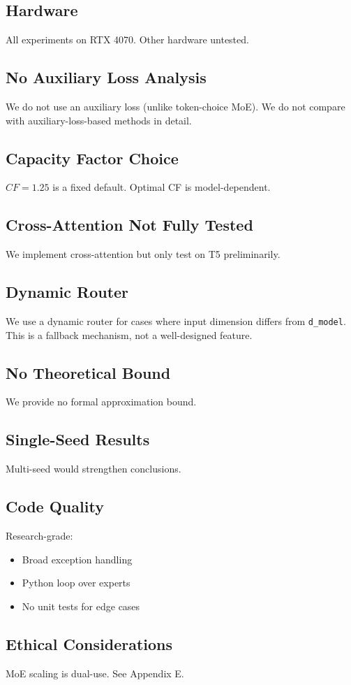 \subsection{Hardware}

All experiments on RTX 4070. Other hardware untested.

\subsection{No Auxiliary Loss Analysis}

We do not use an auxiliary loss (unlike token-choice MoE). We do not 
compare with auxiliary-loss-based methods in detail.

\subsection{Capacity Factor Choice}

$CF = 1.25$ is a fixed default. Optimal CF is 
model-dependent.

\subsection{Cross-Attention Not Fully Tested}

We implement cross-attention but only test on T5 preliminarily.

\subsection{Dynamic Router}

We use a dynamic router for cases where input dimension differs from 
\texttt{d\_model}. This is a fallback mechanism, not a well-designed feature.

\subsection{No Theoretical Bound}

We provide no formal approximation bound.

\subsection{Single-Seed Results}

Multi-seed would strengthen conclusions.

\subsection{Code Quality}

Research-grade:
\begin{itemize}
\item Broad exception handling
\item Python loop over experts
\item No unit tests for edge cases

\end{itemize}
\subsection{Ethical Considerations}

MoE scaling is dual-use. See Appendix E.

